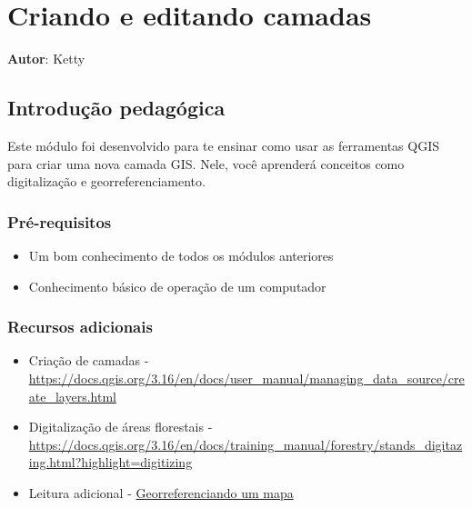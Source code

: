 \documentclass[
  portuguese,
]{krantz}
\providecommand{\tightlist}{%
  \setlength{\itemsep}{0pt}\setlength{\parskip}{0pt}}
\begin{document}
\hypertarget{criando-e-editando-camadas}{%
\chapter{Criando e editando camadas}\label{criando-e-editando-camadas}}

\textbf{Autor}: Ketty

\hypertarget{introduuxe7uxe3o-pedaguxf3gica-7}{%
\section{Introdução pedagógica}\label{introduuxe7uxe3o-pedaguxf3gica-7}}

Este módulo foi desenvolvido para te ensinar como usar as ferramentas QGIS para criar uma nova camada GIS. Nele, você aprenderá conceitos como digitalização e georreferenciamento.

\hypertarget{pruxe9-requisitos-7}{%
\subsection{Pré-requisitos}\label{pruxe9-requisitos-7}}

\begin{itemize}
\tightlist
\item
  Um bom conhecimento de todos os módulos anteriores
\item
  Conhecimento básico de operação de um computador
\end{itemize}

\hypertarget{recursos-adicionais-7}{%
\subsection{Recursos adicionais}\label{recursos-adicionais-7}}

\begin{itemize}
\tightlist
\item
  Criação de camadas - \url{https://docs.qgis.org/3.16/en/docs/user_manual/managing_data_source/create_layers.html}
\item
  Digitalização de áreas florestais - \href{https://docs.\%20qgis.org/3.16/en/docs/training_manual/forestry/stands_digitazing.html?highlight=digitizing}{https://docs.qgis.org/3.16/en/docs/training\_manual/forestry/stands\_digitazing.html?highlight=digitizing}
\item
  Leitura adicional - \href{https://docs.qgis.org/3.16/en/docs/training_manual/forestry/map_georeferencing.html?highlight=georeferencing}{Georreferenciando um mapa}
\end{itemize}
\end{document}
